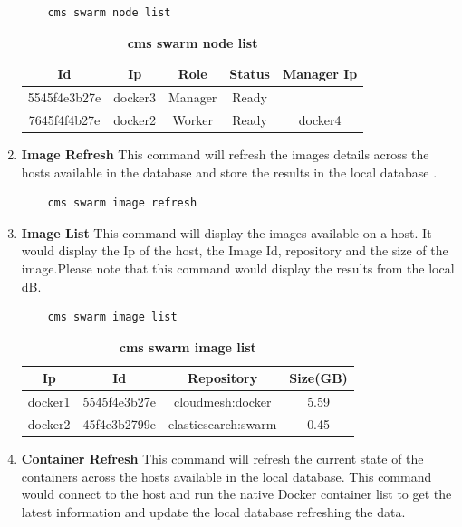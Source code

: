 \documentclass[9pt,twocolumn,twoside]{../../styles/osajnl}
\begin{document}
\begin{enumerate}
    \begin{verbatim}
    cms swarm node list
    \end{verbatim} 

     \begin{table}[htbp]
     \caption{\bf cms swarm node list }
     \begin{tabular}{ccccc}
     \hline
      Id & Ip & Role &Status & Manager Ip\\
      \hline
      5545f4e3b27e &docker3& Manager&Ready&  \\
      7645f4f4b27e &docker2& Worker&Ready&docker4  \\
     \hline
     \end{tabular}
     \label{tab:tab8}
     \end{table}
     
    \item \textbf{Image Refresh}
    This command will refresh the images details across the hosts available in the database and store the results in the local database .
    
    \begin{verbatim}
    cms swarm image refresh
    \end{verbatim} 
     
    \item \textbf{Image List}
    This command will display the images available on a host.
    It would display the Ip of the host, the Image Id, repository and the size of the image.Please note that this command would display the results from the local dB.\\
    
    \begin{verbatim}
    cms swarm image list
    \end{verbatim} 
    
    \begin{table}[htbp]
     \caption{\bf cms swarm image list }
     \begin{tabular}{cccc}
     \hline
      Ip & Id & Repository & Size(GB)\\
      \hline
      docker1 & 5545f4e3b27e & cloudmesh:docker & 5.59 \\
      docker2 & 45f4e3b2799e & elasticsearch:swarm & 0.45 \\
     \hline
     \end{tabular}
     \label{tab:tab9}
     \end{table}
     
    \item \textbf{Container Refresh}
    This command will refresh the current state of the containers across the hosts available in the local database. This command would connect to the host and run the native Docker container list to get the latest information and update the local database  refreshing the data. \\
    

\end{enumerate}
\end{document}
